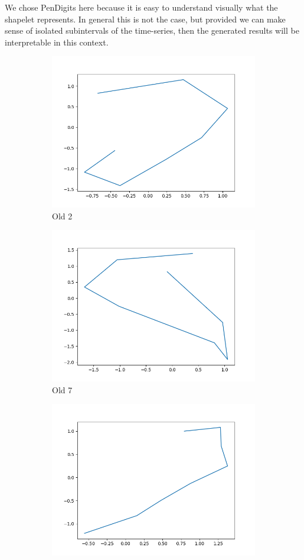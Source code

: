 We chose PenDigits here because it is easy to understand visually what the shapelet represents. In general this is not the case, but provided we can make sense of isolated subintervals of the time-series, then the generated results will be interpretable in this context.
\begin{figure}[ht]
    \begin{subfigure}[b]{0.5\linewidth}
        \centering
        \includegraphics[width=0.75\linewidth]{images/pendigits/old_2}
        \caption{Old 2}
        \label{fig:a}
    \end{subfigure}
    \begin{subfigure}[b]{0.5\linewidth}
        \centering
        \includegraphics[width=0.75\linewidth]{images/pendigits/old_7}
        \caption{Old 7}
        \label{fig:b}
    \end{subfigure}
    \begin{subfigure}[b]{0.5\linewidth}
        \centering
        \includegraphics[width=0.75\linewidth]{images/pendigits/new_2}

\end{subfigure}
\end{figure}
